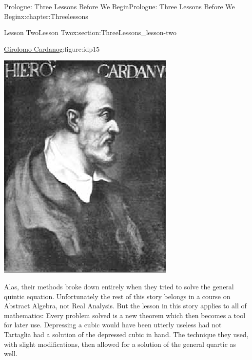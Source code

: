 \documentclass[oneside,10pt,]{book}
\numberwithin{equation}{section}
\begin{document}
\begin{chapterptx}{Prologue: Three Lessons Before We Begin}{}{Prologue: Three Lessons Before We Begin}{}{}{x:chapter:Threelessons}
\begin{sectionptx}{Lesson Two}{}{Lesson Two}{}{}{x:section:ThreeLessons_lesson-two}
\begin{figureptx}{\href{https://mathshistory.st-andrews.ac.uk/Biographies/Cardan}{Girolomo Cardano}\protect\footnotemark{}}{g:figure:idp15}{}
\begin{image}{0.36}{0.28}{0.36}
\includegraphics[width=\linewidth]{images/Cardan.png}
\end{image}%
\tcblower
\end{figureptx}%
%
 Alas, their methods broke down entirely when they tried to solve the general quintic equation.  Unfortunately the rest of this story belongs in a course on Abstract Algebra, not Real Analysis.  But the lesson in this story applies to all of mathematics: Every problem solved is a new theorem which then becomes a tool for later use.  Depressing a cubic would have been utterly useless had not Tartaglia had a solution of the depressed cubic in hand.  The technique they used, with slight modifications, then allowed for a solution of the general quartic as well.%
\par

\end{sectionptx}
\end{chapterptx}
\end{document}

